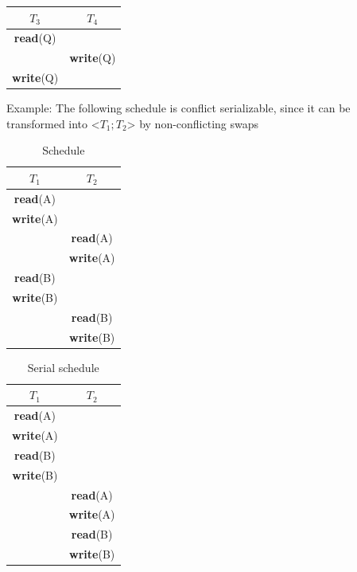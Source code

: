 \begin{table}[H]
    \centering
    \begin{tabular}{c|c}
        $T_3$ & $T_4$ \\
        \hline
         \textbf{read}(Q) &  \\
         & \textbf{write}(Q) \\
         \textbf{write}(Q) & \\
    \end{tabular}
\end{table}

Example: The following schedule is conflict serializable, since it can be transformed into <$T_1;T_2$> by non-conflicting swaps

\begin{minipage}{0.5\textwidth}
\begin{table}[H]
    \centering
    \begin{tabular}{c|c}
        $T_1$ & $T_2$ \\
        \hline
         \textbf{read}(A) & \\
         \textbf{write}(A) & \\
         & \textbf{read}(A)\\
         & \textbf{write}(A)  \\
         \textbf{read}(B)& \\
        \textbf{write}(B)  & \\
         & \textbf{read}(B) \\
         & \textbf{write}(B) \\
    \end{tabular}
    \caption{Schedule}
\end{table}
\end{minipage}
\begin{minipage}{0.5\textwidth}
    \begin{table}[H]
    \centering
    \begin{tabular}{c|c}
        $T_1$ & $T_2$ \\
        \hline
         \textbf{read}(A) & \\
         \textbf{write}(A) & \\
         \textbf{read}(B)& \\
        \textbf{write}(B)  & \\
         & \textbf{read}(A)\\
         & \textbf{write}(A)  \\
         & \textbf{read}(B) \\
         & \textbf{write}(B) \\
    \end{tabular}
    \caption{Serial schedule}
\end{table}
\end{minipage}


